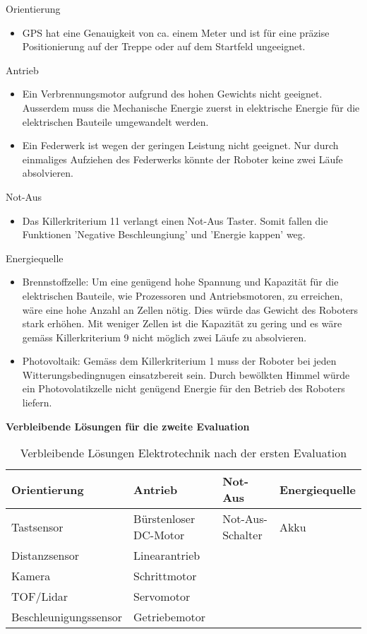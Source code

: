 Orientierung
\begin{itemize}
    \item GPS hat eine Genauigkeit von ca. einem Meter und ist für eine präzise Positionierung auf der Treppe oder auf dem Startfeld ungeeignet.
\end{itemize}
Antrieb
\begin{itemize}
    \item Ein Verbrennungsmotor aufgrund des hohen Gewichts nicht geeignet. Ausserdem muss die Mechanische Energie zuerst in elektrische Energie für die elektrischen Bauteile umgewandelt werden.
    \item Ein Federwerk ist wegen der geringen Leistung nicht geeignet. Nur durch einmaliges Aufziehen des Federwerks könnte der Roboter keine zwei Läufe absolvieren.
\end{itemize}
Not-Aus
\begin{itemize}
    \item Das Killerkriterium 11 verlangt einen Not-Aus Taster. Somit fallen die Funktionen 'Negative Beschleungiung' und 'Energie kappen' weg.
\end{itemize}
Energiequelle
\begin{itemize}
    \item Brennstoffzelle: Um eine genügend hohe Spannung und Kapazität für die elektrischen Bauteile, wie Prozessoren und Antriebsmotoren, zu erreichen, wäre eine hohe Anzahl an Zellen nötig. Dies würde das Gewicht des Roboters stark erhöhen. Mit weniger Zellen ist die Kapazität zu gering und es wäre gemäss Killerkriterium 9 nicht möglich zwei Läufe zu absolvieren.
    \item Photovoltaik: Gemäss dem Killerkriterium 1 muss der Roboter bei jeden Witterungsbedingnugen einsatzbereit sein. Durch bewölkten Himmel würde ein Photovolatikzelle nicht genügend Energie für den Betrieb des Roboters liefern.
\end{itemize}

\textbf{Verbleibende Lösungen für die zweite Evaluation}
\begin{center}
\begin{table}[h!]
    \begin{tabular}{l|l|l|l}
        \textbf{Orientierung} & \textbf{Antrieb} & \textbf{Not-Aus} & \textbf{Energiequelle} \\ 
        \hline
        Tastsensor & Bürstenloser DC-Motor & Not-Aus-Schalter & Akku\\  
        Distanzsensor & Linearantrieb &  &\\
        Kamera & Schrittmotor & &\\
        TOF/Lidar & Servomotor & &\\
        Beschleunigungssensor & Getriebemotor & & 
    \end{tabular}
    \caption{Verbleibende Lösungen Elektrotechnik nach der ersten Evaluation}
\end{table}
\end{center}


